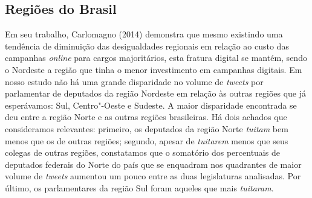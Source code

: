 
\subsection{Regiões do Brasil}

Em seu trabalho, Carlomagno (2014) demonstra que mesmo existindo uma
tendência de diminuição das desigualdades regionais em relação ao custo
das campanhas \emph{online} para cargos majoritários, esta fratura digital se
mantém, sendo o Nordeste a região que tinha o menor investimento em
campanhas digitais. Em nosso estudo não há uma grande disparidade no
volume de \emph{tweets} por parlamentar de deputados da região Nordeste
em relação às outras regiões que já esperávamos: Sul, Centro"-Oeste e
Sudeste. A maior disparidade encontrada se deu entre a região Norte e
as outras regiões brasileiras. Há dois achados que consideramos
relevantes: primeiro, os deputados da região Norte \emph{tuitam} bem
menos que os de outras regiões; segundo, apesar de \emph{tuitarem} menos
que seus colegas de outras regiões, constatamos que o somatório dos
percentuais de deputados federais do Norte do país que se enquadram nos
quadrantes de maior volume de \emph{tweets} aumentou um pouco entre as
duas legislaturas analisadas. Por último, os parlamentares da região Sul
foram aqueles que mais \emph{tuitaram}.

